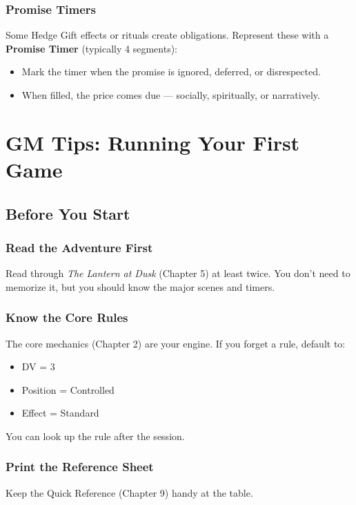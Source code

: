 \documentclass[11pt]{book}
\begin{document}
\subsection*{Promise Timers}

Some Hedge Gift effects or rituals create obligations. Represent these with a \textbf{Promise Timer} (typically 4 segments):

\begin{itemize}
  \item Mark the timer when the promise is ignored, deferred, or disrespected.
  \item When filled, the price comes due --- socially, spiritually, or narratively.
\end{itemize}

\clearpage

\chapter{GM Tips: Running Your First Game}
\label{ch:gm-tips}

\section{Before You Start}

\subsection*{Read the Adventure First}
Read through \textit{The Lantern at Dusk} (Chapter 5) at least twice. You don't need to memorize it, but you should know the major scenes and timers.

\subsection*{Know the Core Rules}
The core mechanics (Chapter 2) are your engine. If you forget a rule, default to:
\begin{itemize}
  \item DV = 3
  \item Position = Controlled
  \item Effect = Standard
\end{itemize}
You can look up the rule after the session.

\subsection*{Print the Reference Sheet}
Keep the Quick Reference (Chapter 9) handy at the table.
\end{document}
